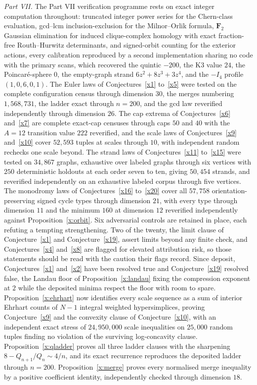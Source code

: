 \documentclass[11pt]{article}
\theoremstyle{definition}
\begin{document}
\emph{Part VII.}  The Part VII verification programme rests on exact integer computation throughout: truncated integer power series for the Chern-class evaluation, gcd--lcm inclusion-exclusion for the Milnor--Orlik formula, $\mathbf F_2$ Gaussian elimination for induced clique-complex homology with exact fraction-free Routh--Hurwitz determinants, and signed-orbit counting for the exterior actions, every calibration reproduced by a second implementation sharing no code with the primary scans, which recovered the quintic $-200$, the K3 value $24$, the Poincar\'e-sphere $0$, the empty-graph strand $6z^2+8z^3+3z^4$, and the $-I_4$ profile $(1,0,6,0,1)$.  The Euler laws of Conjectures~\ref{x1} to~\ref{x5} were tested on the complete configuration census through dimension $30$, the merges numbering $1{,}568{,}731$, the ladder exact through $n=200$, and the gcd law reverified independently through dimension $26$.  The cap extrema of Conjectures~\ref{x6} and~\ref{x7} are complete exact-cap censuses through caps $50$ and $40$ with the $A=12$ transition value $222$ reverified, and the scale laws of Conjectures~\ref{x9} and~\ref{x10} cover $52{,}593$ tuples at scales through $10$, with independent random rechecks one scale beyond.  The strand laws of Conjectures~\ref{x11} to~\ref{x15} were tested on $34{,}867$ graphs, exhaustive over labeled graphs through six vertices with $250$ deterministic holdouts at each order seven to ten, giving $50{,}454$ strands, and reverified independently on an exhaustive labeled corpus through five vertices.  The monodromy laws of Conjectures~\ref{x16} to~\ref{x20} cover all $57{,}758$ orientation-preserving signed cycle types through dimension $21$, with every type through dimension $11$ and the minimum $160$ at dimension $12$ reverified independently against Proposition~\ref{x:orbit}.  Six adversarial controls are retained in place, each refuting a tempting strengthening.  Two of the twenty, the limit clause of Conjecture~\ref{x1} and Conjecture~\ref{x19}, assert limits beyond any finite check, and Conjectures~\ref{x4} and~\ref{x8} are flagged for elevated attribution risk, so those statements should be read with the caution their flags record.  Since deposit, Conjectures~\ref{x1} and~\ref{x2} have been resolved true and Conjecture~\ref{x19} resolved false, the Landau floor of Proposition~\ref{x:landau} fixing the compression exponent at $2$ while the deposited minima respect the floor with room to spare.  Proposition~\ref{x:ehrhart} now identifies every scale sequence as a sum of interior Ehrhart counts of $N-1$ integral weighted hypersimplices, proving Conjecture~\ref{x9} and the convexity clause of Conjecture~\ref{x10}, with an independent exact stress of $24{,}950{,}000$ scale inequalities on $25{,}000$ random tuples finding no violation of the surviving log-concavity clause.  Proposition~\ref{x:qladder} proves all three ladder clauses with the sharpening $8-Q_{n+1}/Q_n\sim4/n$, and its exact recurrence reproduces the deposited ladder through $n=200$.  Proposition~\ref{x:merge} proves every normalised merge inequality by a positive coefficient identity, independently checked through dimension $18$.
\end{document}
